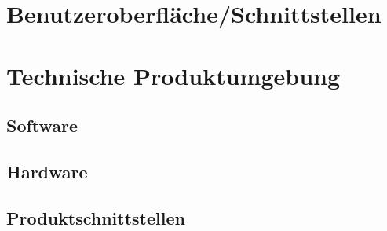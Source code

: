 \documentclass[parskip=full]{scrartcl} %
\begin{document}
\section{Benutzeroberfläche/Schnittstellen}
\newpage



\section{Technische Produktumgebung}

\subsection{Software}
\subsection{Hardware}
\subsection{Produktschnittstellen}
\newpage
\end{document}
